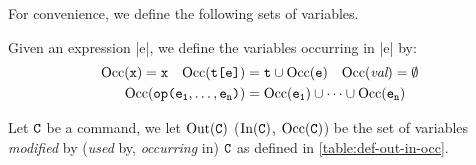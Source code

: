 For convenience, we define the following sets of variables.

\begin{definition}
    Given an expression \prc|e|, we define the variables occurring in \prc|e| by:
    \[\begin{aligned}[t]
          \Occ(\textnormal{\prc|x|}) &=\textnormal{\prc|x|} & \Occ(\textnormal{\prc|t[|$\comm{e}$\prc|]|}) &=\textnormal{\prc|t|} \cup \Occ(\comm{e})
          & \Occ(\emph{val}) &=\emptyset\\
          \span\span \Occ(\textnormal{\prc|op(|$\comm{e_1}, \hdots,\comm{e_n}$\prc|)|}) &=\Occ(\comm{e_1}) \cup \cdots \cup \Occ(\comm{e_n}) \span\span
    \end{aligned}\]
\end{definition}

\begin{definition}
    \label{def:in-out-occ}
    Let $\mathtt{C}$ be a command, we let  $\operatorname{Out}(\mathtt{C})$ (\resp $\operatorname{In}(\mathtt{C})$, \(\operatorname{Occ}(\mathtt{C})\)) be the set of variables \emph{modified} by (\resp \emph{used} by, \emph{occurring} in) $\mathtt{C}$ as defined in \autoref{table:def-out-in-occ}.
\end{definition}

